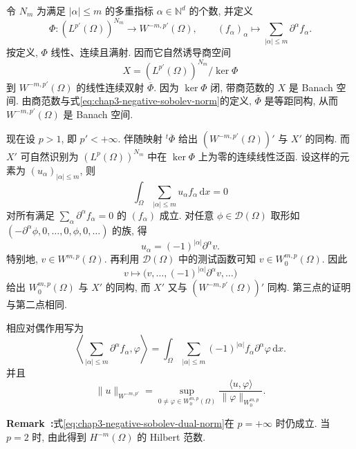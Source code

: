 \begin{Proof}
令 $N_m$ 为满足 $|\alpha|\leq m$ 的多重指标 $\alpha\in\mathbb N^d$ 的个数, 并定义
\[
 \Phi:(L^{p'}(\Omega))^{N_m}\longrightarrow W^{-m,p'}(\Omega),
 \qquad(f_\alpha)_\alpha\longmapsto\sum_{|\alpha|\leq m}\partial^\alpha f_\alpha.
\]
按定义, $\Phi$ 线性、连续且满射. 因而它自然诱导商空间
\[
 X=(L^{p'}(\Omega))^{N_m}/\ker\Phi
\]
到 $W^{-m,p'}(\Omega)$ 的线性连续双射 $\overline\Phi$. 因为 $\ker\Phi$ 闭, 带商范数的 $X$ 是 Banach 空间. 由商范数与式\eqref{eq:chap3-negative-sobolev-norm}的定义, $\overline\Phi$ 是等距同构, 从而 $W^{-m,p'}(\Omega)$ 是 Banach 空间.

现在设 $p>1$, 即 $p'<+\infty$. 伴随映射 ${}^t\overline\Phi$ 给出 $(W^{-m,p'}(\Omega))'$ 与 $X'$ 的同构. 而 $X'$ 可自然识别为 $(L^p(\Omega))^{N_m}$ 中在 $\ker\Phi$ 上为零的连续线性泛函. 设这样的元素为 $(u_\alpha)_{|\alpha|\leq m}$, 则
\[
 \int_\Omega\sum_{|\alpha|\leq m}u_\alpha f_\alpha\,\mathrm dx=0
\]
对所有满足 $\sum_\alpha\partial^\alpha f_\alpha=0$ 的 $(f_\alpha)$ 成立. 对任意 $\phi\in\mathcal D(\Omega)$ 取形如 $(-\partial^\alpha\phi,0,\ldots,0,\phi,0,\ldots)$ 的族, 得
\[
 u_\alpha=(-1)^{|\alpha|}\partial^\alpha v.
\]
特别地, $v\in W^{m,p}(\Omega)$. 再利用 $\mathcal D(\Omega)$ 中的测试函数可知 $v\in W_0^{m,p}(\Omega)$. 因此
\[
 v\longmapsto\bigl(v,\ldots,(-1)^{|\alpha|}\partial^\alpha v,\ldots\bigr)
\]
给出 $W_0^{m,p}(\Omega)$ 与 $X'$ 的同构, 而 $X'$ 又与 $(W^{-m,p'}(\Omega))'$ 同构. 第三点的证明与第二点相同.
\end{Proof}

相应对偶作用写为
\begin{equation}
 \left\langle\sum_{|\alpha|\leq m}\partial^\alpha f_\alpha,\varphi\right\rangle
 =\int_\Omega\sum_{|\alpha|\leq m}(-1)^{|\alpha|}f_\alpha\partial^\alpha\varphi\,\mathrm dx.
 \label{eq:chap3-negative-sobolev-pairing}
\end{equation}
并且
\begin{equation}
 \|u\|_{W^{-m,p'}}=
 \sup_{0\neq\varphi\in W_0^{m,p}(\Omega)}
 \frac{\langle u,\varphi\rangle}{\|\varphi\|_{W_0^{m,p}}}.
 \label{eq:chap3-negative-sobolev-dual-norm}
\end{equation}

\par\noindent{}\textbf{Remark~\thechapterthreesectiontworemark:}\label{rem:chap3-negative-dual-norm-endpoints}\quad 式\eqref{eq:chap3-negative-sobolev-dual-norm}在 $p=+\infty$ 时仍成立. 当 $p=2$ 时, 由此得到 $H^{-m}(\Omega)$ 的 Hilbert 范数.


